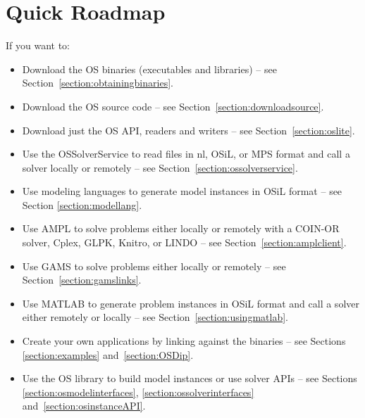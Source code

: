 \section{Quick Roadmap}\label{section:roadmap}

If you want to:

\begin{itemize}
\item Download the OS binaries  (executables and libraries) -- see Section~\ref{section:obtainingbinaries}.

\ifruncode\else

\item Download the OS source code -- see Section~\ref{section:downloadsource}.

\item Download just the OS API, readers and writers -- see Section~\ref{section:oslite}.
\fi

\item Use the OSSolverService to read files in nl, OSiL, 
or MPS format and call a solver locally or remotely -- see Section~\ref{section:ossolverservice}.

\item Use modeling languages to generate model instances in OSiL format -- see Section \ref{section:modellang}.

\item Use AMPL to solve problems either locally or remotely
with a COIN-OR solver, Cplex,
GLPK, \ifknitro Knitro, \fi
or LINDO -- see Section~\ref{section:amplclient}.

\item Use GAMS to solve problems either locally or remotely -- see Section~\ref{section:gamslinks}.

\ifruncode\else
\item Use MATLAB to generate problem instances in OSiL format 
and call a solver either remotely or locally -- see Section~\ref{section:usingmatlab}.

\item Create your own applications by linking against the binaries -- see Sections \ref{section:examples} and~\ref{section:OSDip}.

\item Use the OS library to build model instances or use solver APIs -- see Sections \ref{section:osmodelinterfaces},
\ref{section:ossolverinterfaces} and~\ref{section:osinstanceAPI}.


\end{itemize}
